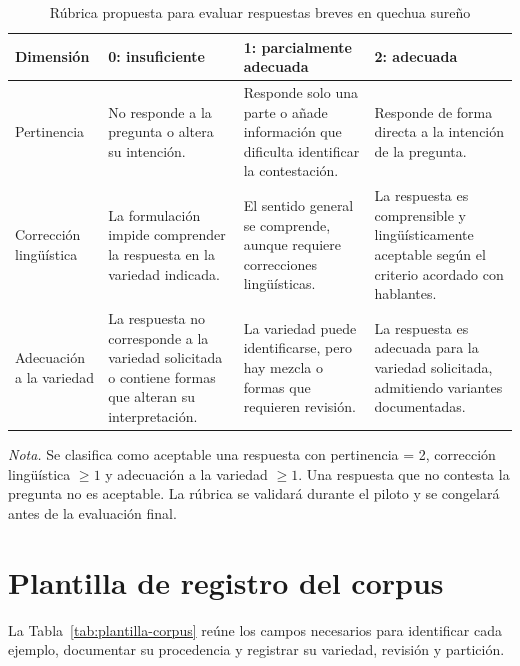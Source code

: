\begin{table}[H]
\centering
\begin{threeparttable}
\caption{Rúbrica propuesta para evaluar respuestas breves en quechua sureño}
\label{tab:rubrica-respuestas}
\scriptsize
\begin{tabularx}{\textwidth}{@{}P{2.7cm}LLL@{}}
\toprule
\textbf{Dimensión} & \textbf{0: insuficiente} & \textbf{1: parcialmente adecuada} & \textbf{2: adecuada} \\
\midrule
Pertinencia & No responde a la pregunta o altera su intención. & Responde solo una parte o añade información que dificulta identificar la contestación. & Responde de forma directa a la intención de la pregunta. \\
\addlinespace
Corrección lingüística & La formulación impide comprender la respuesta en la variedad indicada. & El sentido general se comprende, aunque requiere correcciones lingüísticas. & La respuesta es comprensible y lingüísticamente aceptable según el criterio acordado con hablantes. \\
\addlinespace
Adecuación a la variedad & La respuesta no corresponde a la variedad solicitada o contiene formas que alteran su interpretación. & La variedad puede identificarse, pero hay mezcla o formas que requieren revisión. & La respuesta es adecuada para la variedad solicitada, admitiendo variantes documentadas. \\
\bottomrule
\end{tabularx}
\begin{tablenotes}
\item \textit{Nota.} Se clasifica como aceptable una respuesta con pertinencia = 2, corrección lingüística $\geq 1$ y adecuación a la variedad $\geq 1$. Una respuesta que no contesta la pregunta no es aceptable. La rúbrica se validará durante el piloto y se congelará antes de la evaluación final.
\end{tablenotes}
\end{threeparttable}
\end{table}

\clearpage
\chapter{Plantilla de registro del corpus}
\label{anexo:banco_consultas}

La Tabla~\ref{tab:plantilla-corpus} reúne los campos necesarios para identificar cada ejemplo, documentar su procedencia y registrar su variedad, revisión y partición.

